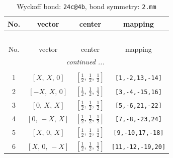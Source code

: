 \documentclass[fleqn,8pt]{jsarticle}
\begin{document}
\begin{longtable}{cccc}
\caption{Wyckoff bond: {\tt 24c@4b}, bond symmetry: {\tt 2.mm}}
 \\
 \hline \hline
No. & vector & center & mapping \\ \hline \endfirsthead

\multicolumn{3}{l}{\tablename\ \thetable{}} \\
 \hline \hline
No. & vector & center & mapping \\ \hline \endhead

 \hline \hline
\multicolumn{3}{r}{\footnotesize\it continued ...} \\ \endfoot

 \hline \hline
\multicolumn{3}{r}{} \\ \endlastfoot

1 & $\left[ X,\, X,\, 0 \right]$ & $\left[ \frac{1}{2},\, \frac{1}{2},\, \frac{1}{2} \right]$ & {\tt [1,-2,13,-14]} \\ \hline
2 & $\left[ - X,\, X,\, 0 \right]$ & $\left[ \frac{1}{2},\, \frac{1}{2},\, \frac{1}{2} \right]$ & {\tt [3,-4,-15,16]} \\ \hline
3 & $\left[ 0,\, X,\, X \right]$ & $\left[ \frac{1}{2},\, \frac{1}{2},\, \frac{1}{2} \right]$ & {\tt [5,-6,21,-22]} \\ \hline
4 & $\left[ 0,\, - X,\, X \right]$ & $\left[ \frac{1}{2},\, \frac{1}{2},\, \frac{1}{2} \right]$ & {\tt [7,-8,-23,24]} \\ \hline
5 & $\left[ X,\, 0,\, X \right]$ & $\left[ \frac{1}{2},\, \frac{1}{2},\, \frac{1}{2} \right]$ & {\tt [9,-10,17,-18]} \\ \hline
6 & $\left[ X,\, 0,\, - X \right]$ & $\left[ \frac{1}{2},\, \frac{1}{2},\, \frac{1}{2} \right]$ & {\tt [11,-12,-19,20]} \\
\end{longtable}
\renewcommand{\arraystretch}{1.2}
\end{document}
